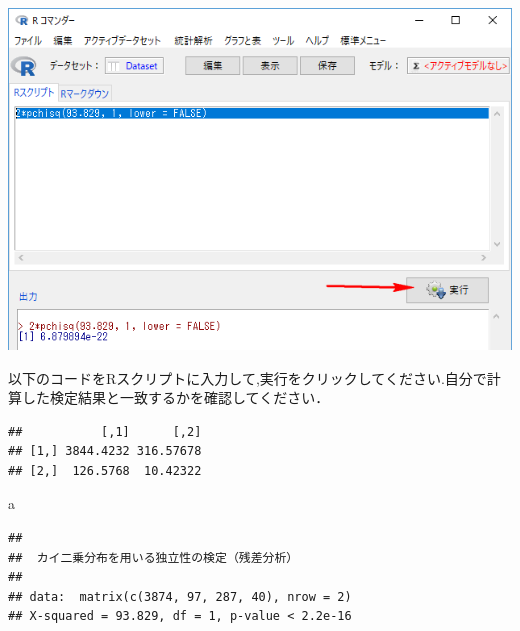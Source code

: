 \documentclass[]{problemset}
\newenvironment{Shaded}{\begin{snugshade}}{\end{snugshade}}
\newcommand{\CommentTok}[1]{\textcolor[rgb]{0.56,0.35,0.01}{\textit{#1}}}
\newcommand{\DataTypeTok}[1]{\textcolor[rgb]{0.13,0.29,0.53}{#1}}
\newcommand{\DecValTok}[1]{\textcolor[rgb]{0.00,0.00,0.81}{#1}}
\newcommand{\KeywordTok}[1]{\textcolor[rgb]{0.13,0.29,0.53}{\textbf{#1}}}
\newcommand{\NormalTok}[1]{#1}
\newcommand{\OperatorTok}[1]{\textcolor[rgb]{0.81,0.36,0.00}{\textbf{#1}}}
\newcommand{\StringTok}[1]{\textcolor[rgb]{0.31,0.60,0.02}{#1}}
\begin{document}
\begin{center}\includegraphics[width=0.7\linewidth]{pic/mychisqtest02} \end{center}

以下のコードをRスクリプトに入力して,実行をクリックしてください.自分で計算した検定結果と一致するかを確認してください．

\begin{Shaded}
\end{Shaded}

\begin{verbatim}
##           [,1]      [,2]
## [1,] 3844.4232 316.57678
## [2,]  126.5768  10.42322
\end{verbatim}

\begin{Shaded}
\begin{Highlighting}[]
\NormalTok{a}
\end{Highlighting}
\end{Shaded}

\begin{verbatim}
## 
##  カイ二乗分布を用いる独立性の検定（残差分析）
## 
## data:  matrix(c(3874, 97, 287, 40), nrow = 2)
## X-squared = 93.829, df = 1, p-value < 2.2e-16
\end{verbatim}
\end{document}
